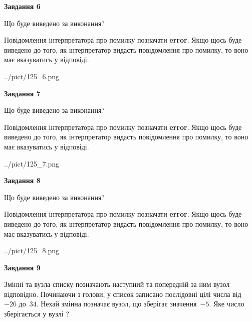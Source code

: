 \documentclass[12pt, ukrainian]{article}
\begin{document}
{\begin {large}
{\begin {center}\textbf{Завдання 6}\end {center}}\par
Що буде виведено за виконання?

Повідомлення інтерпретатора про помилку позначати \textbf{error}.
Якщо щось буде виведено до того, як інтерпретатор видасть повідомлення про помилку, 
то воно має вказуватись у відповіді. \par


\begin{center}
	{../pict/125_6.png}
\end{center}
\newpage

{\begin {center}\textbf{Завдання 7}\end {center}}\par
Що буде виведено за виконання?

Повідомлення інтерпретатора про помилку позначати \textbf{error}.
Якщо щось буде виведено до того, як інтерпретатор видасть повідомлення про помилку, 
то воно має вказуватись у відповіді. \par


\begin{center}
	{../pict/125_7.png}
\end{center}
\newpage

{\begin {center}\textbf{Завдання 8}\end {center}}\par
Що буде виведено за виконання?

Повідомлення інтерпретатора про помилку позначати \textbf{error}.
Якщо щось буде виведено до того, як інтерпретатор видасть повідомлення про помилку, 
то воно має вказуватись у відповіді. \par


\begin{center}
	{../pict/125_8.png}
\end{center}
\newpage

{\begin {center}\textbf{Завдання 9}\end {center}}\par
Змінні  та  вузла списку позначають наступний та попередній за ним вузол відповідно. Починаючи з голови, у список записано послідовні цілі числа від~$-26$ до~$34$. Нехай змінна  позначає вузол, що зберігає значення~$-5$.
Яке число зберігається у вузлі  ?\par
\newpage


\end{large}}
\end{document}
